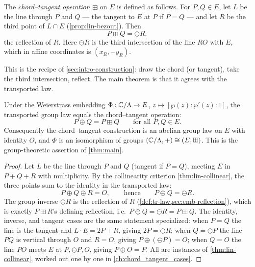 \begin{definition}
\label{def:tr-chordtangent}
The \emph{chord--tangent operation} \(\boxplus\) on \(E\) is defined as follows.
For \(P, Q \in E\), let \(L\) be the line through \(P\) and \(Q\) --- the tangent to
\(E\) at \(P\) if \(P = Q\) --- and let \(R\) be the third point of \(L \cap E\)
(\cref{prop:lin-bezout}). Then
\[
  P \boxplus Q = \ominus R,
\]
the reflection of \(R\). Here \(\ominus R\) is the third intersection of the line
\(RO\) with \(E\), which in affine coordinates is \((x_R, -y_R)\).
\end{definition}

This is the recipe of \cref{sec:intro-construction}: draw the chord (or tangent),
take the third intersection, reflect. The main theorem is that it agrees with the
transported law.

\begin{theorem}
\label{thm:tr-main}
Under the Weierstrass embedding \(\Phi : \mathbb{C}/\Lambda \to E\),
\(z \mapsto [\wp(z):\wp'(z):1]\), the transported group law equals the
chord--tangent operation:
\[
  P \oplus Q = P \boxplus Q \qquad\text{for all } P, Q \in E .
\]
Consequently the chord--tangent construction is an abelian group law on \(E\) with
identity \(O\), and \(\Phi\) is an isomorphism of groups
\((\mathbb{C}/\Lambda, +) \cong (E, \boxplus)\). This is the group-theoretic assertion of
\cref{thm:main}.
\end{theorem}

\begin{proof}
Let \(L\) be the line through \(P\) and \(Q\) (tangent if \(P = Q\)), meeting \(E\)
in \(P + Q + R\) with multiplicity. By the collinearity criterion
\cref{thm:lin-collinear}, the three points sum to the identity in the transported
law:
\[
  P \oplus Q \oplus R = O,
  \qquad\text{hence}\qquad
  P \oplus Q = \ominus R .
\]
The group inverse \(\ominus R\) is the reflection of \(R\)
(\cref{def:tr-law,sec:emb-reflection}), which is exactly \(P \boxplus R\)'s
defining reflection, i.e.\ \(P \oplus Q = \ominus R = P \boxplus Q\). The identity,
inverse, and tangent cases are the same statement specialized: when \(P = Q\) the
line is the tangent and \(L \cdot E = 2P + R\), giving \(2P = \ominus R\); when
\(Q = \ominus P\) the line \(PQ\) is vertical through \(O\) and \(R = O\), giving
\(P \oplus (\ominus P) = O\); when \(Q = O\) the line \(PO\) meets \(E\) at
\(P, \ominus P, O\), giving \(P \oplus O = P\). All are instances of
\cref{thm:lin-collinear}, worked out one by one in \cref{ch:chord_tangent_cases}.
\end{proof}

